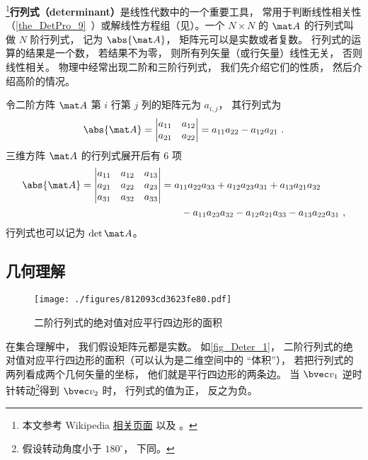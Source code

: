 

\footnote{本文参考 Wikipedia \href{https://en.wikipedia.org/wiki/Determinant}{相关页面} 以及 \cite{同济线}。}\textbf{行列式（determinant）}是线性代数中的一个重要工具， 常用于判断线性相关性（\autoref{the_DetPro_9}~）或解线性方程组（见）。一个 $N\times N$ 的 $\mat A$ 的行列式叫做 $N$ 阶行列式， 记为 $\abs{\mat A}$， 矩阵元可以是实数或者复数。 行列式的运算的结果是一个数， 若结果不为零， 则所有列矢量（或行矢量）线性无关， 否则线性相关。 物理中经常出现二阶和三阶行列式， 我们先介绍它们的性质， 然后介绍高阶的情况。

令二阶方阵 $\mat A$ 第 $i$ 行第 $j$ 列的矩阵元为 $a_{i,j}$， 其行列式为
\begin{equation}\label{eq_Deter_1}
\abs{\mat A} =
\begin{vmatrix}
a_{11} & a_{12} \\
a_{21} & a_{22}
\end{vmatrix} = a_{11}a_{22} - a_{12}a_{21}~.
\end{equation}
三维方阵 $\mat A$ 的行列式展开后有 6 项
\begin{equation}\label{eq_Deter_2}
\begin{aligned}
\abs{\mat A} = 
\begin{vmatrix}
a_{11} & a_{12} & a_{13} \\
a_{21} & a_{22} & a_{23} \\
a_{31} & a_{32} & a_{33}
\end{vmatrix}
&=
a_{11}a_{22}a_{33} + a_{12}a_{23}a_{31} + a_{13}a_{21}a_{32} \\
&\qquad- a_{11}a_{23}a_{32} - a_{12}a_{21}a_{33} - a_{13}a_{22}a_{31}~,
\end{aligned}
\end{equation}
行列式也可以记为 $\det{\mat A}$。

\subsection{几何理解}

\begin{figure}[ht]
\centering
\texttt{[image: ./figures/812093cd3623fe80.pdf]}
\caption{二阶行列式的绝对值对应平行四边形的面积} \label{fig_Deter_1}
\end{figure}
在集合理解中， 我们假设矩阵元都是实数。 如\autoref{fig_Deter_1}， 二阶行列式的绝对值对应平行四边形的面积（可以认为是二维空间中的 “体积”）， 若把行列式的两列看成两个几何矢量的坐标， 他们就是平行四边形的两条边。 当 $\bvec v_1$ 逆时针转动\footnote{假设转动角度小于 $180^\circ$， 下同。}得到 $\bvec v_2$ 时， 行列式的值为正， 反之为负。

